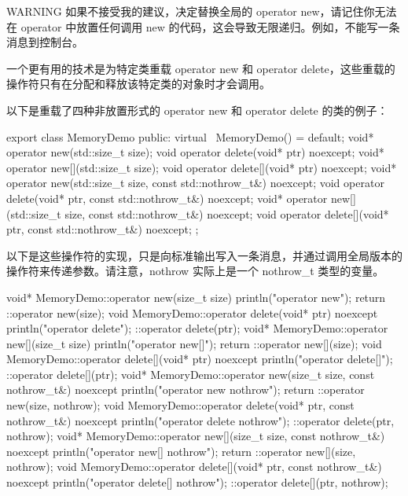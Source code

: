 \begin{myWarning}{WARNING}
如果不接受我的建议，决定替换全局的 operator new，请记住你无法在 operator 中放置任何调用 new 的代码，这会导致无限递归。例如，不能写一条消息到控制台。
\end{myWarning}

一个更有用的技术是为特定类重载 operator new 和 operator delete，这些重载的操作符只有在分配和释放该特定类的对象时才会调用。

以下是重载了四种非放置形式的 operator new 和 operator delete 的类的例子：

\begin{cpp}
export class MemoryDemo
{
    public:
        virtual ~MemoryDemo() = default;
        void* operator new(std::size_t size);
        void operator delete(void* ptr) noexcept;
        void* operator new[](std::size_t size);
        void operator delete[](void* ptr) noexcept;
        void* operator new(std::size_t size, const std::nothrow_t&) noexcept;
        void operator delete(void* ptr, const std::nothrow_t&) noexcept;
        void* operator new[](std::size_t size, const std::nothrow_t&) noexcept;
        void operator delete[](void* ptr, const std::nothrow_t&) noexcept;
};
\end{cpp}

以下是这些操作符的实现，只是向标准输出写入一条消息，并通过调用全局版本的操作符来传递参数。请注意，nothrow 实际上是一个 nothrow\_t 类型的变量。

\begin{cpp}
void* MemoryDemo::operator new(size_t size)
{
    println("operator new");
    return ::operator new(size);
}
void MemoryDemo::operator delete(void* ptr) noexcept
{
    println("operator delete");
    ::operator delete(ptr);
}
void* MemoryDemo::operator new[](size_t size)
{
    println("operator new[]");
    return ::operator new[](size);
}
void MemoryDemo::operator delete[](void* ptr) noexcept
{
    println("operator delete[]");
    ::operator delete[](ptr);
}
void* MemoryDemo::operator new(size_t size, const nothrow_t&) noexcept
{
    println("operator new nothrow");
    return ::operator new(size, nothrow);
}
void MemoryDemo::operator delete(void* ptr, const nothrow_t&) noexcept
{
    println("operator delete nothrow");
    ::operator delete(ptr, nothrow);
}
void* MemoryDemo::operator new[](size_t size, const nothrow_t&) noexcept
{
    println("operator new[] nothrow");
    return ::operator new[](size, nothrow);
}
void MemoryDemo::operator delete[](void* ptr, const nothrow_t&) noexcept
{
    println("operator delete[] nothrow");
    ::operator delete[](ptr, nothrow);
}
\end{cpp}

